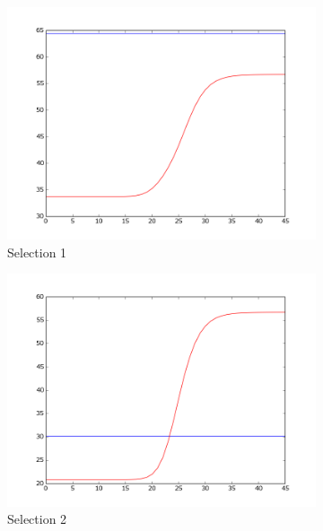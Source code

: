 \documentclass{article}
\begin{document}
\begin{figure}[!ht]
    \centering
    \begin{subfigure}[b]{0.4\textwidth}
        \includegraphics[width=\textwidth]{Part2/II221.png}
        \caption{Selection 1}
    \end{subfigure}
    \begin{subfigure}[b]{0.4\textwidth}
        \includegraphics[width=\textwidth]{Part2/II222.png}
        \caption{Selection 2}
    \end{subfigure}
    \begin{subfigure}[b]{0.4\textwidth}

\end{subfigure}
\end{figure}
\end{document}
